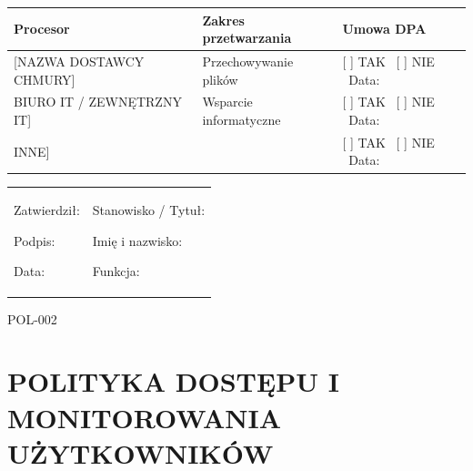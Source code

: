 \documentclass[12pt,a4paper]{article}
\begin{document}
\begin{longtable}[]{@{}>{\raggedright\arraybackslash}p{}>{\raggedright\arraybackslash}p{}>{\raggedright\arraybackslash}p{}@{}}
\toprule\noalign{}
Procesor & Zakres przetwarzania & Umowa DPA \\
\midrule\noalign{}
\endhead
\bottomrule\noalign{}
\endlastfoot
{[}NAZWA DOSTAWCY CHMURY{]} & Przechowywanie plików & {[} {]} TAK ~{[}
{]} NIE ~Data: \underline{\hspace{2cm}} \\
{[}BIURO IT / ZEWNĘTRZNY IT{]} & Wsparcie informatyczne & {[} {]} TAK
~{[} {]} NIE ~Data: \underline{\hspace{2cm}} \\
{[}INNE{]} & \underline{\hspace{3cm}} & {[} {]} TAK ~{[}
{]} NIE ~Data: \underline{\hspace{2cm}} \\
\end{longtable}

\begin{longtable}[]{@{}
  >{\raggedright\arraybackslash}p{}
  >{\raggedright\arraybackslash}p{}@{}}
\toprule\noalign{}
\endhead
\bottomrule\noalign{}
\endlastfoot
\begin{minipage}[t]{\linewidth}\raggedright
Zatwierdził:

Podpis: \underline{\hspace{3cm}}

Data: \underline{\hspace{4cm}}
\end{minipage} & \begin{minipage}[t]{\linewidth}\raggedright
Stanowisko / Tytuł:

Imię i nazwisko: \underline{\hspace{3cm}}

Funkcja: \underline{\hspace{3cm}}
\end{minipage} \\
\end{longtable}

\label{doc2}
POL-002

\section{POLITYKA DOSTĘPU I MONITOROWANIA
UŻYTKOWNIKÓW}\label{polityka}
\end{document}
